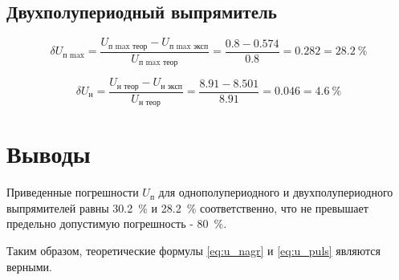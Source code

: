 \subsection{Двухполупериодный выпрямитель}

\[
\delta U_\text{п max} = \frac{U_\text{п max\ \ теор} - U_\text{п max\ \ эксп}}{U_\text{п max\ \ теор}} = \frac{0.8 - 0.574}{0.8} = 0.282 = 28.2~\%
\]

\[
\delta U_\text{н} = \frac{U_\text{н\ \ теор} - U_\text{н\ \ эксп}}{U_\text{н\ \ теор}} = \frac{8.91 - 8.501}{8.91} = 0.046 = 4.6~\%
\]

\section{Выводы}

Приведенные погрешности $U_\text{п}$ для однополупериодного и двухполупериодного выпрямителей равны 30.2~\% и 28.2~\% соответственно, что не превышает предельно допустимую погрешность - 80~\%.

Таким образом, теоретические формулы \ref{eq:u_nagr} и \ref{eq:u_puls} являются верными.

